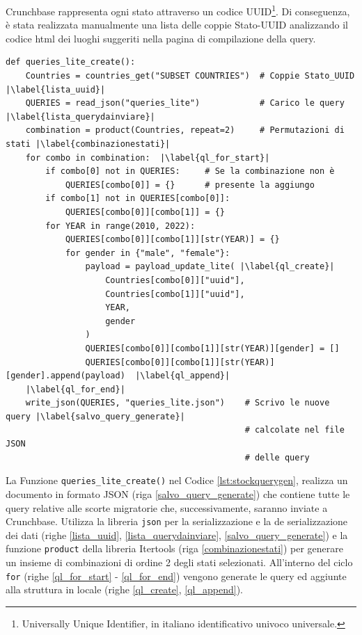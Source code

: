 Crunchbase rappresenta ogni stato attraverso un codice UUID\footnote{Universally Unique Identifier, in italiano identificativo univoco universale.}. Di conseguenza, è stata realizzata manualmente una lista delle coppie Stato-UUID analizzando il codice html dei luoghi suggeriti nella pagina di compilazione della query.

\begin{listing}[htbp]
\begin{verbatim}
def queries_lite_create():
    Countries = countries_get("SUBSET COUNTRIES")  # Coppie Stato_UUID |\label{lista_uuid}|
    QUERIES = read_json("queries_lite")            # Carico le query  |\label{lista_querydainviare}|
    combination = product(Countries, repeat=2)     # Permutazioni di stati |\label{combinazionestati}|
    for combo in combination:  |\label{ql_for_start}|
        if combo[0] not in QUERIES:     # Se la combinazione non è
            QUERIES[combo[0]] = {}      # presente la aggiungo
        if combo[1] not in QUERIES[combo[0]]:   
            QUERIES[combo[0]][combo[1]] = {}
        for YEAR in range(2010, 2022):                      
            QUERIES[combo[0]][combo[1]][str(YEAR)] = {}
            for gender in {"male", "female"}:
                payload = payload_update_lite( |\label{ql_create}|
                    Countries[combo[0]]["uuid"],
                    Countries[combo[1]]["uuid"],
                    YEAR,
                    gender
                )
                QUERIES[combo[0]][combo[1]][str(YEAR)][gender] = []
                QUERIES[combo[0]][combo[1]][str(YEAR)][gender].append(payload)  |\label{ql_append}|
    |\label{ql_for_end}|
    write_json(QUERIES, "queries_lite.json")    # Scrivo le nuove query |\label{salvo_query_generate}|
                                                # calcolate nel file JSON
                                                # delle query
\end{verbatim}
\caption{Funzione \texttt{queries\_lite\_create()} che genera un file JSON contenente le query relative alle scorte migratorie da inviare a Crunchbase}     \label{lst:stockquerygen}
\end{listing}
\par
La Funzione \texttt{queries\_lite\_create()} nel Codice \ref{lst:stockquerygen}, realizza un documento in formato JSON (riga \ref{salvo_query_generate}) che contiene tutte le query relative alle scorte migratorie che, successivamente, saranno inviate a Crunchbase. Utilizza la libreria \texttt{json} per la serializzazione e la de serializzazione dei dati (righe \ref{lista_uuid}, \ref{lista_querydainviare}, \ref{salvo_query_generate}) e la funzione \texttt{product} della libreria Itertools (riga \ref{combinazionestati}) per generare un insieme di combinazioni di ordine 2 degli stati selezionati. 
All'interno del ciclo \texttt{for} (righe \ref{ql_for_start} - \ref{ql_for_end}) vengono generate le query ed aggiunte alla struttura in locale (righe \ref{ql_create}, \ref{ql_append}).

